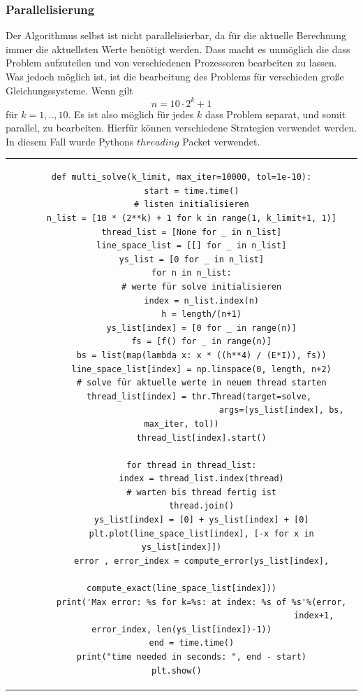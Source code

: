 \documentclass[12pt,titlepage]{article}
\begin{document}
		\subsubsection{Parallelisierung}
			Der Algorithmus selbst ist nicht parallelisierbar, da für die aktuelle Berechnung immer die aktuellsten Werte benötigt werden. Dass macht es unmöglich die dass Problem aufzuteilen und von verschiedenen Prozessoren bearbeiten zu lassen. Was jedoch möglich ist, ist die bearbeitung des Problems für verschieden große Gleichungssysteme. Wenn gilt
			\begin{equation*}
				n = 10 \cdot 2^k +1
			\end{equation*}
			für $k=1,..,10$. Es ist also möglich für jedes $k$ dass Problem separat, und somit parallel, zu bearbeiten.
			Hierfür können verschiedene Strategien verwendet werden. In diesem Fall wurde Pythons $threading$ Packet verwendet.\newline \newline
			\begin{tabular}{c}
			\begin{lstlisting}
def multi_solve(k_limit, max_iter=10000, tol=1e-10):
	start = time.time()
	# listen initialisieren
    n_list = [10 * (2**k) + 1 for k in range(1, k_limit+1, 1)]
    thread_list = [None for _ in n_list]
    line_space_list = [[] for _ in n_list]
    ys_list = [0 for _ in n_list]
    for n in n_list:
    	# werte für solve initialisieren
    	index = n_list.index(n)
        h = length/(n+1)
        ys_list[index] = [0 for _ in range(n)]
        fs = [f() for _ in range(n)]
        bs = list(map(lambda x: x * ((h**4) / (E*I)), fs))
        line_space_list[index] = np.linspace(0, length, n+2)
        # solve für aktuelle werte in neuem thread starten
        thread_list[index] = thr.Thread(target=solve, 
        								args=(ys_list[index], bs, max_iter, tol))
        thread_list[index].start()

    for thread in thread_list:
        index = thread_list.index(thread)
        # warten bis thread fertig ist
        thread.join()
        ys_list[index] = [0] + ys_list[index] + [0]
        plt.plot(line_space_list[index], [-x for x in ys_list[index]])
        error , error_index = compute_error(ys_list[index],
         													compute_exact(line_space_list[index]))
       	print('Max error: %s for k=%s: at index: %s of %s'%(error,
       												 index+1, error_index, len(ys_list[index])-1))
	end = time.time()
    print("time needed in seconds: ", end - start)
    plt.show()		
	 	\end{lstlisting}
		\end{tabular}
\end{document}
